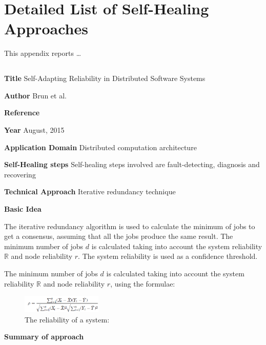 \appendix
\chapter{Detailed List of Self-Healing Approaches}
\label{ap:approches}

This appendix reports \ldots 

\section{} \label{}
\begin{compactitem}
\item[\textbf{Title}]Self-Adapting Reliability in Distributed Software Systems
\item[\textbf{Author}] 
Brun et al.
\item[\textbf{Reference}] 
\cite{brun_self-adapting_2015}
\item[\textbf{Year}] 
August, 2015
\item[\textbf{Application Domain}] 
Distributed computation architecture
\item[\textbf{Self-Healing steps}] Self-healing steps involved are fault-detecting, diagnosis and recovering
\item[\textbf{Technical Approach}]Iterative redundancy technique
\item[\textbf{Basic Idea}] 

The iterative redundancy algorithm is used to calculate the minimum of jobs to get a consensus, assuming that all the jobs produce the same result. The minimum number of jobs $d$ is calculated taking into account the system reliability $\mathbb{R}$ and node reliability $r$. The system reliability is used as a confidence threshold.

The minimum number of jobs $d$ is calculated taking into account the system reliability $\mathbb{R}$ and node reliability $r$, using the formulae:


\begin{figure}[H]
\center
\includegraphics[width=1.5in]{img/formulae}
\caption{The reliability of a system:}
\end{figure} 





\item[\textbf{Summary of approach}]



\end{compactitem}

